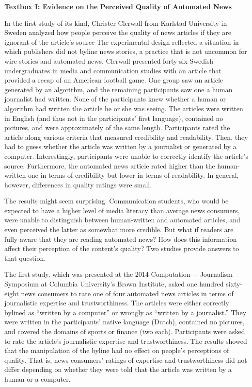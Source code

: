 \documentclass[notoc, symmetric, nobib, nols]{towcenter-guideto-book}
\begin{document}
\begin{framed}
\noindent\textbf{Textbox I: Evidence on the Perceived Quality of Automated News} 

In the first study of its kind, Christer Clerwall from Karlstad University in Sweden analyzed how people perceive the quality of news articles if they are ignorant of the article's source\autocite{clerwall15} The experimental design reflected a situation in which publishers did not byline news stories, a practice that is not uncommon for wire stories and automated news.\autocite{ulanoff14} Clerwall presented forty-six Swedish undergraduates in media and communication studies with an article that provided a recap of an American football game. One group saw an article generated by an algorithm, and the remaining participants saw one a human journalist had written. None of the participants knew whether a human or algorithm had written the article he or she was seeing. The articles were written in English (and thus not in the participants' first language), contained no pictures, and were approximately of the same length. Participants rated the article along various criteria that measured credibility and readability. Then, they had to guess whether the article was written by a journalist or generated by a computer. Interestingly, participants were unable to correctly identify the article's source. Furthermore, the automated news article rated higher than the human-written one in terms of credibility but lower in terms of readability. In general, however, differences in quality ratings were small.

The results might seem surprising. Communication students, who would be expected to have a higher level of media literacy than average news consumers, were unable to distinguish between human-written and automated articles, and even perceived the latter as somewhat more credible. But what if readers are fully aware that they are reading automated news? How does this information affect their perception of the content's quality? Two studies provide answers to that question. 

The first study, which was presented at the 2014 Computation + Journalism Symposium at Columbia University's Brown Institute, asked one hundred sixty-eight news consumers to rate one of four automated news articles in terms of journalistic expertise and trustworthiness.\autocite{kaa14} The articles were either correctly bylined as ``written by a computer'' or wrongly as ``written by a journalist.'' They were written in the participants' native language (Dutch), contained no pictures, and covered the domains of sports or finance (two each). Participants were asked to rate the article's journalistic expertise and trustworthiness. The results showed that the manipulation of the byline had no effect on people's perceptions of quality. That is, news consumers' ratings of expertise and trustworthiness did not differ depending on whether they were told that the article was written by a human or a computer. 


\end{framed}
\end{document}
